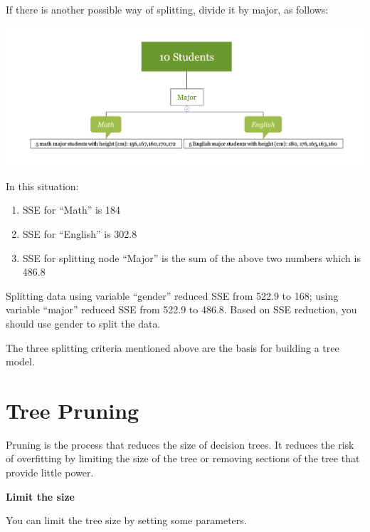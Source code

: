 \documentclass[12pt,]{krantz}
\providecommand{\tightlist}{%
  \setlength{\itemsep}{0pt}\setlength{\parskip}{0pt}}
\begin{document}
If there is another possible way of splitting, divide it by major, as follows:

\includegraphics{images/varEN2.png}

In this situation:

\begin{enumerate}
\def\labelenumi{\arabic{enumi}.}
\tightlist
\item
  SSE for ``Math'' is 184
\item
  SSE for ``English'' is 302.8
\item
  SSE for splitting node ``Major'' is the sum of the above two numbers which is 486.8
\end{enumerate}

Splitting data using variable ``gender'' reduced SSE from 522.9 to 168; using variable ``major'' reduced SSE from 522.9 to 486.8. Based on SSE reduction, you should use gender to split the data.

The three splitting criteria mentioned above are the basis for building a tree model.

\hypertarget{tree-pruning}{%
\section{Tree Pruning}\label{tree-pruning}}

Pruning is the process that reduces the size of decision trees. It reduces the risk of overfitting by limiting the size of the tree or removing sections of the tree that provide little power.

\textbf{Limit the size}

You can limit the tree size by setting some parameters.
\end{document}
